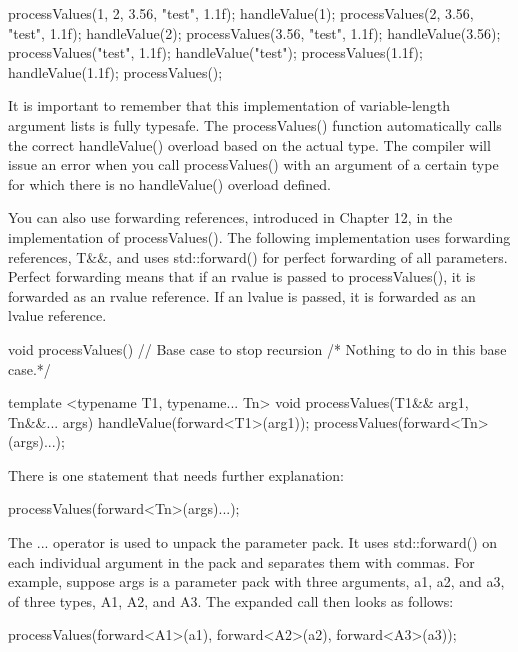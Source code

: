 \begin{cpp}
processValues(1, 2, 3.56, "test", 1.1f);
    handleValue(1);
        processValues(2, 3.56, "test", 1.1f);
        handleValue(2);
        processValues(3.56, "test", 1.1f);
            handleValue(3.56);
            processValues("test", 1.1f);
                handleValue("test");
                processValues(1.1f);
                    handleValue(1.1f);
                    processValues();
\end{cpp}

It is important to remember that this implementation of variable-length argument lists is fully typesafe. The processValues() function automatically calls the correct handleValue() overload based on the actual type. The compiler will issue an error when you call processValues() with an argument of a certain type for which there is no handleValue() overload defined.

You can also use forwarding references, introduced in Chapter 12, in the implementation of processValues(). The following implementation uses forwarding references, T\&\&, and uses std::forward() for perfect forwarding of all parameters. Perfect forwarding means that if an rvalue is passed to processValues(), it is forwarded as an rvalue reference. If an lvalue is passed, it is forwarded as an lvalue reference.

\begin{cpp}
void processValues() // Base case to stop recursion
{ /* Nothing to do in this base case.*/ }

template <typename T1, typename... Tn>
void processValues(T1&& arg1, Tn&&... args)
{
    handleValue(forward<T1>(arg1));
    processValues(forward<Tn>(args)...);
}
\end{cpp}

There is one statement that needs further explanation:

\begin{cpp}
processValues(forward<Tn>(args)...);
\end{cpp}

The ... operator is used to unpack the parameter pack. It uses std::forward() on each individual argument in the pack and separates them with commas. For example, suppose args is a parameter pack with three arguments, a1, a2, and a3, of three types, A1, A2, and A3. The expanded call then looks as follows:

\begin{cpp}
processValues(forward<A1>(a1),
              forward<A2>(a2),
              forward<A3>(a3));
\end{cpp}


